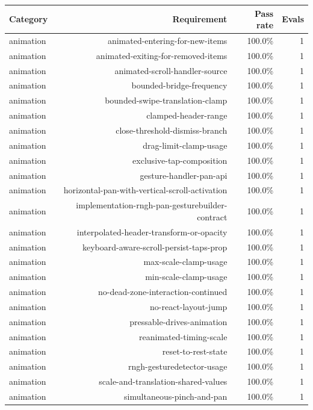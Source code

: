 \begin{table}[htbp]
\centering
\begin{tabular}{lrrr}
\toprule
Category & Requirement & Pass rate & Evals \\
\midrule
animation & animated-entering-for-new-items & 100.0\% & 1 \\
animation & animated-exiting-for-removed-items & 100.0\% & 1 \\
animation & animated-scroll-handler-source & 100.0\% & 1 \\
animation & bounded-bridge-frequency & 100.0\% & 1 \\
animation & bounded-swipe-translation-clamp & 100.0\% & 1 \\
animation & clamped-header-range & 100.0\% & 1 \\
animation & close-threshold-dismiss-branch & 100.0\% & 1 \\
animation & drag-limit-clamp-usage & 100.0\% & 1 \\
animation & exclusive-tap-composition & 100.0\% & 1 \\
animation & gesture-handler-pan-api & 100.0\% & 1 \\
animation & horizontal-pan-with-vertical-scroll-activation & 100.0\% & 1 \\
animation & implementation-rngh-pan-gesturebuilder-contract & 100.0\% & 1 \\
animation & interpolated-header-transform-or-opacity & 100.0\% & 1 \\
animation & keyboard-aware-scroll-persist-taps-prop & 100.0\% & 1 \\
animation & max-scale-clamp-usage & 100.0\% & 1 \\
animation & min-scale-clamp-usage & 100.0\% & 1 \\
animation & no-dead-zone-interaction-continued & 100.0\% & 1 \\
animation & no-react-layout-jump & 100.0\% & 1 \\
animation & pressable-drives-animation & 100.0\% & 1 \\
animation & reanimated-timing-scale & 100.0\% & 1 \\
animation & reset-to-rest-state & 100.0\% & 1 \\
animation & rngh-gesturedetector-usage & 100.0\% & 1 \\
animation & scale-and-translation-shared-values & 100.0\% & 1 \\
animation & simultaneous-pinch-and-pan & 100.0\% & 1 \\

\end{tabular}
\end{table}
